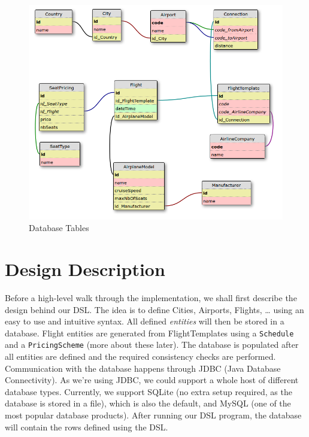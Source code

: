 \documentclass[a4paper]{article}
\newcommand{\cc}[1]{\texttt{#1}}
\begin{document}
\begin{figure}[ht!]
  \includegraphics[width=1.0\textwidth]{../analysis/dbtables-diagram.png}
  \caption{Database Tables}\label{fig:database-tables}
\end{figure}

\section{Design Description}
\label{sec:design-description}




Before a high-level walk through the implementation, we shall first describe the design behind our DSL.
The idea is to define Cities, Airports, Flights, \ldots{} using an easy to use and intuitive syntax.
All defined \emph{entities} will then be stored in a database.
Flight entities are generated from FlightTemplates using a \cc{Schedule} and a \cc{Pricing\-Scheme} (more about these later).
The database is populated after all entities are defined and the required consistency checks are performed.
Communication with the database happens through \textsc{JDBC} (Java Database Connectivity).
As we're using \textsc{JDBC}, we could support a whole host of different database types.
Currently, we support SQLite (no extra setup required, as the database is stored in a file), which is also the default, and MySQL (one of the most popular database products).
After running our DSL program, the database will contain the rows defined using the DSL.\@
\end{document}

